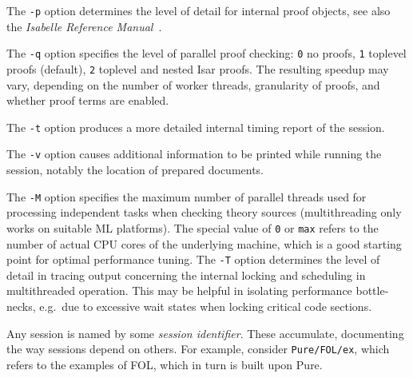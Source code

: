 \begin{isabellebody}
\begin{isamarkuptext}
  \medskip The \verb|-p| option determines the level of detail
  for internal proof objects, see also the \emph{Isabelle Reference
  Manual}~\cite{isabelle-ref}.

  \medskip The \verb|-q| option specifies the level of parallel
  proof checking: \verb|0| no proofs, \verb|1| toplevel
  proofs (default), \verb|2| toplevel and nested Isar proofs.
  The resulting speedup may vary, depending on the number of worker
  threads, granularity of proofs, and whether proof terms are enabled.

  \medskip The \verb|-t| option produces a more detailed
  internal timing report of the session.

  \medskip The \verb|-v| option causes additional information
  to be printed while running the session, notably the location of
  prepared documents.

  \medskip The \verb|-M| option specifies the maximum number of
  parallel threads used for processing independent tasks when checking
  theory sources (multithreading only works on suitable ML platforms).
  The special value of \verb|0| or \verb|max| refers to the
  number of actual CPU cores of the underlying machine, which is a
  good starting point for optimal performance tuning.  The \verb|-T| option determines the level of detail in tracing output
  concerning the internal locking and scheduling in multithreaded
  operation.  This may be helpful in isolating performance
  bottle-necks, e.g.\ due to excessive wait states when locking
  critical code sections.

  \medskip Any \hyperlink{tool.usedir}{\mbox{}} session is named by some \emph{session
  identifier}. These accumulate, documenting the way sessions depend
  on others. For example, consider \verb|Pure/FOL/ex|, which
  refers to the examples of FOL, which in turn is built upon Pure.


\end{isamarkuptext}
\end{isabellebody}

